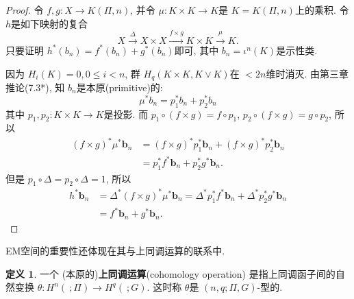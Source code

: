 \documentclass{ctexart}
\theoremstyle{plain}
\theoremstyle{definition}
\newtheorem{definition}[theorem]{定义}
\renewcommand{\emph}{\textbf}
\begin{document}
        \begin{proof}
            令 $f,g:X\to K(\Pi,n)$, 并令 $\mu:K\times K\to K$是 $K=K(\Pi,n)$上的乘积. 令 $h$是如下映射的复合
            \begin{equation*}
                X \xrightarrow{\Delta} X \times X \xrightarrow{f \times g} K \times K \xrightarrow{\mu} K .
            \end{equation*}
            只要证明 $h^{*}(b_{n})=f^{*}(b_{n})+g^{*}(b_{n})$即可, 其中 $b_{n}=\iota^{n}(K)$是示性类.

            因为 $H_{i}(K)=0, 0\le i<n$, 群 $H_{q}(K\times K,K\vee K)$在 $<2n$维时消灭. 由\cite{Whitehead1978}第三章推论(7.3*), 知 $b_{n}$是本原(primitive)的:
            \begin{equation*}
              \mu^{*}b_{n}=p_1^{*}b_{n}+p_2^{*}b_{n}
            \end{equation*}
            其中 $p_1,p_2:K\times K\to K$是投影. 而 $p_1\circ(f\times g)=f\circ p_1$, $p_2\circ (f\times g)=g\circ p_2$, 所以 
            \begin{equation*}
                \begin{aligned}
                    (f \times g)^* \mu^* \mathbf{b}_n & =(f \times g)^* p_1^* \mathbf{b}_n+(f \times g)^* p_2^* \mathbf{b}_n \\
                    & =p_1^* f^* \mathbf{b}_n+p_2^* g^* \mathbf{b}_n .
                \end{aligned}
            \end{equation*}
            但是 $p_1\circ \Delta=p_2\circ \Delta=1$, 所以 
            \begin{equation*}
                \begin{aligned}
                    h^* \mathbf{b}_n & =\Delta^*(f \times g)^* \mu^* \mathbf{b}_n=\Delta^* p_1^* f^* \mathbf{b}_n+\Delta^* p_2^* g^* \mathbf{b}_n \\
                    & =f^* \mathbf{b}_n+g^* \mathbf{b}_n .
                \end{aligned}
            \end{equation*}
        \end{proof}

        EM空间的重要性还体现在其与上同调运算的联系中.

        \begin{definition}
            一个 (本原的)\emph{上同调运算}(cohomology operation) 是指上同调函子间的自然变换 $\theta:H^{n}(\ ;\Pi)\to H^{q}(\ ; G)$. 这时称 $\theta$是 $(n,q;\Pi,G)$-型的.
        \end{definition}
\end{document}

